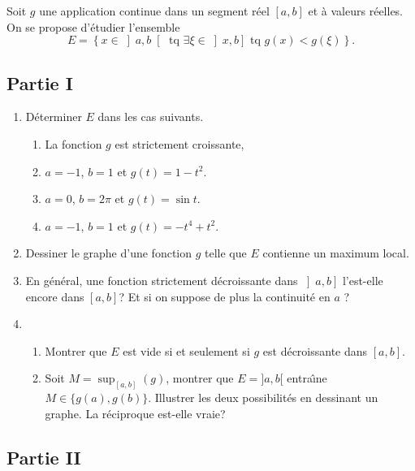 Soit $g$ une application continue dans un segment r{\'e}el $\left[a,b\right]$ et {\`a} valeurs r{\'e}elles. On se propose d'{\'e}tudier l'ensemble
\[
E= \left\lbrace  x\in \left] a,b\right[ \text{ tq }\exists \xi \in \left]
x,b\right] \text{ tq }g(x)<g(\xi )\right\rbrace  \text{.}
\]

\subsection*{Partie I}

\begin{enumerate}
\item  D{\'e}terminer $E$ dans les cas suivants.

\begin{enumerate}
\item La fonction $g$ est strictement croissante,

\item  $a=-1$, $b=1$ et $g(t)=1-t^{2}$.

\item  $a=0$, $b=2\pi $ et $g(t)=\sin t$.

\item  $a=-1$, $b=1$ et $g(t)=-t^{4}+t^{2}$.
\end{enumerate}

\item  Dessiner le graphe d'une fonction $g$ telle que $E$ contienne un maximum local.

\item  En g{\'e}n{\'e}ral, une fonction strictement d{\'e}croissante dans $\left] a,b \right] $ l'est-elle encore dans $\left[ a,b \right] $? Et si on suppose
de plus la continuit{\'e} en $a$ ?

\item
\begin{enumerate}
\item  Montrer que $E$ est vide si et seulement si $g$ est d{\'e}croissante dans $\left[ a,b \right]$.

\item Soit $M=\sup_{\left[ a,b \right]}(g)$, montrer que $E=]a,b[$ entra\^{\i }ne $M\in \{ g(a),g(b)\}$. Illustrer les deux possibilit{\'e}s en dessinant un graphe. La r{\'e}ciproque est-elle vraie?
\end{enumerate}
\end{enumerate}

\subsection*{Partie II}

